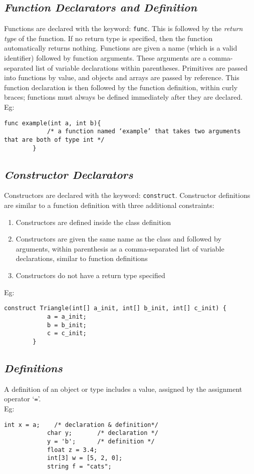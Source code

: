 \documentclass[letterpaper,12pt]{article}
\begin{document}
    \subsection{\textit{Function Declarators and Definition}}
    Functions are declared with the keyword: \texttt{func}. This is followed by the \textit{return type} of the function. If no return type is specified, then the function automatically returns nothing. Functions are given a name (which is a valid identifier) followed by function arguments. These arguments are a comma-separated list of variable declarations within parentheses. Primitives are passed into functions by value, and objects and arrays are passed by reference. This function declaration is then followed by the function definition, within curly braces; functions must always be defined immediately after they are declared.\\
    Eg: \begin{lstlisting}[aboveskip=-13pt]
        func example(int a, int b){
            /* a function named ‘example’ that takes two arguments that are both of type int */
        }
    \end{lstlisting}

    \subsection{\textit{Constructor Declarators}}
    Constructors are declared with the keyword: \texttt{construct}. Constructor definitions are similar to a function definition with three additional constraints: 
    \begin{enumerate}
        \itemsep0em
        \item Constructors are defined inside the class definition
        \item Constructors are given the same name as the class and followed by arguments, within parenthesis as a comma-separated list of variable declarations, similar to function definitions
        \item Constructors do not have a return type specified
    \end{enumerate}
    Eg: \begin{lstlisting}[aboveskip=-13pt]
        construct Triangle(int[] a_init, int[] b_init, int[] c_init) {
            a = a_init;
            b = b_init;
            c = c_init;
        }
    \end{lstlisting}

    \subsection{\textit{Definitions}}
    A definition of an object or type includes a value, assigned by the assignment operator `\texttt{=}'.\\
    Eg: \begin{lstlisting}[aboveskip=-13pt]
            int x = a;    /* declaration & definition*/
            char y;       /* declaration */
            y = 'b';      /* definition */
            float z = 3.4;
            int[3] w = [5, 2, 0];
            string f = "cats";
        \end{lstlisting}
\end{document}
